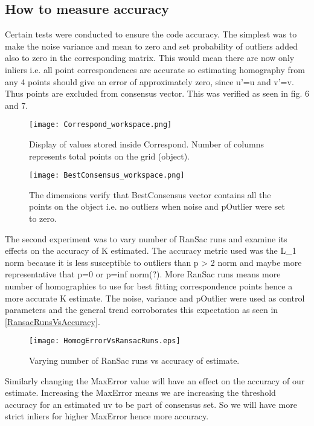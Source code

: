 \documentclass[titlepage]{article}
\begin{document}
\subsection{How to measure accuracy}
Certain tests were conducted to ensure the code accuracy. The simplest was to make the noise variance and mean to zero and set probability of outliers added also to zero in the corresponding matrix. This would mean there are now only inliers i.e. all point correspondences are accurate so estimating homography from any 4 points should give an error of approximately zero, since u’=u and v’=v. Thus  points are excluded from consensus vector. This was verified as seen in fig. 6 and 7.
\begin{wrapfigure}{R}{8.5}
\caption{Display of values stored inside Correspond. Number of columns represents total points on the grid (object).}\label{wrap-fig:1}
\texttt{[image: Correspond\_workspace.png]}
\end{wrapfigure} 
\begin{wrapfigure}{R}{8.5cm}
\caption{The dimensions verify that BestConsensus vector contains all the points on the object i.e. no outliers when noise and pOutlier were set to zero.}\label{wrap-fig:1}
\texttt{[image: BestConsensus\_workspace.png]}
\end{wrapfigure}
The second experiment was to vary number of RanSac runs and examine its effects on the accuracy of K estimated. The accuracy metric used was the L_{1} norm because it is less susceptible to outliers than p > 2 norm and maybe more representative that p=0 or p=inf norm(?). More RanSac  runs means more number of homographies to use for best fitting correspondence points hence a more accurate K estimate. The noise, variance and pOutlier were used as control parameters and the general trend corroborates this expectation as seen in \ref{RansacRunsVsAccuracy}.
\begin{wrapfigure}{L}{5.5cm}
\label{RansacRunsVsAccuracy}
\caption{Varying number of RanSac runs vs accuracy of estimate.}\label{wrap-fig:1}
\texttt{[image: HomogErrorVsRansacRuns.eps]}
\end{wrapfigure} 
Similarly changing the MaxError value will have an effect on the accuracy of our estimate. Increasing the MaxError means we are increasing the threshold accuracy for an estimated uv to be part of consensus set. So we will have more strict inliers for higher MaxError hence more accuracy.
\end{document}
